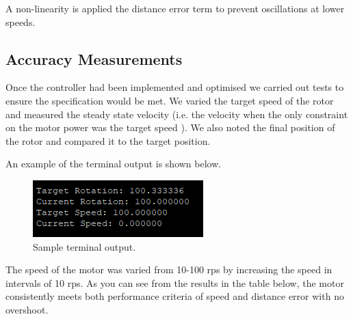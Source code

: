 \documentclass{article}
\begin{document}
\noindent
A non-linearity is applied the distance error term to prevent oscillations at lower speeds.

\subsection{Accuracy Measurements}
\noindent
Once the controller had been implemented and optimised we carried out tests to ensure the specification would be met.
We varied the target speed of the rotor and measured the steady state velocity (i.e. the velocity when the only constraint on the motor power was the target speed ). We also noted the final position of the rotor and compared it to the target position.

\bigskip

\noindent
An example of the terminal output is shown below.

\begin{figure}[H]
\begin{center}
   \includegraphics[width=0.5\linewidth]{position accuracy.png}
\end{center}
   \caption{Sample terminal output.}
\label{fig:long}
\label{fig:onecol}
\end{figure}

\noindent
The speed of the motor was varied from 10-100 rps by increasing the speed in intervals of 10 rps. As you can see from the results in the table below, the motor consistently meets both performance criteria of speed and distance error with no overshoot.
\end{document}
